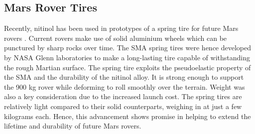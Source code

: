 \begin{multicols}{2}



\section{Mars Rover Tires}
Recently, nitinol has been used in prototypes of a spring tire for future Mars rovers \cite{nasa_2017}. Current rovers make use of solid aluminium wheels which can be punctured by sharp rocks over time. The SMA spring tires were hence developed by NASA Glenn laboratories to make a long-lasting tire capable of withstanding the rough Martian surface. The spring tire exploits the pseudoelastic property of the SMA and the durability of the nitinol alloy. It is strong enough to support the 900 kg rover while deforming to roll smoothly over the terrain. Weight was also a key consideration due to the increased launch cost. The spring tires are relatively light compared to their solid counterparts, weighing in at just a few kilograms each. Hence, this advancement shows promise in helping to extend the lifetime and durability of future Mars rovers.


\end{multicols}
